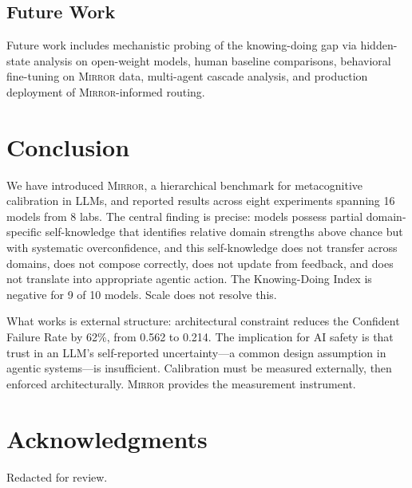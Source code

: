 \documentclass[10pt]{article}
\newcommand{\mirror}{\textsc{Mirror}}
\begin{document}
\subsection{Future Work}

Future work includes mechanistic probing of the knowing-doing gap via hidden-state analysis on open-weight models, human baseline comparisons, behavioral fine-tuning on \mirror{} data, multi-agent cascade analysis, and production deployment of \mirror{}-informed routing.

\vspace{-1mm}
\section{Conclusion}
\label{sec:conclusion}

We have introduced \mirror{}, a hierarchical benchmark for metacognitive
calibration in LLMs, and reported results across eight experiments spanning 16
models from 8 labs. The central finding is precise: models possess partial domain-specific
self-knowledge that identifies relative domain strengths above chance but with
systematic overconfidence, and this self-knowledge
does not transfer across domains, does not compose correctly, does not update from
feedback, and does not translate into appropriate agentic action. The Knowing-Doing
Index is negative for 9 of 10 models. Scale does not resolve this.

What works is external structure: architectural constraint reduces the Confident
Failure Rate by 62\%, from 0.562 to 0.214. The implication for AI safety is that
trust in an LLM's self-reported uncertainty---a common design assumption in agentic
systems---is insufficient. Calibration must be measured externally, then enforced
architecturally. \mirror{} provides the measurement instrument.

\section*{Acknowledgments}

Redacted for review.

\FloatBarrier


\end{document}
